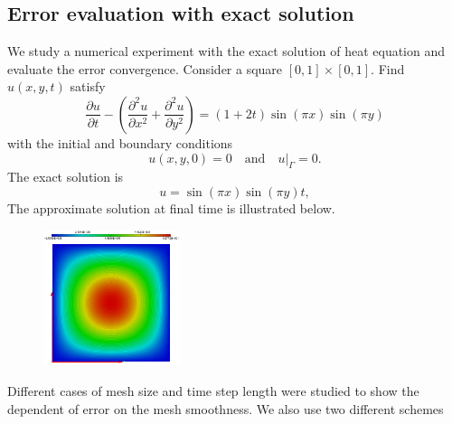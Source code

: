 \subsection{Error evaluation with exact solution}
We study a numerical experiment with the exact solution of heat equation and evaluate the error convergence. Consider a square $[0,1]\times[0,1]$. Find $u(x,y,t)$ satisfy
\begin{equation}
\dfrac{\partial u}{\partial t} - \left(\dfrac{\partial^2 u}{\partial x^2} + \dfrac{\partial^2u}{\partial y^2}\right) = (1+2t)\sin(\pi x) \sin(\pi y)
\end{equation}
with the initial and boundary conditions
$$
u(x,y,0) = 0 \quad \text{and} \quad u|_\Gamma = 0.
$$
The exact solution is
$$
u = \sin(\pi x) \sin(\pi y) t,
$$
The approximate solution at final time is illustrated below.
\begin{figure}[ht]
	\centering
	\includegraphics[width=4cm]{dirac}
\end{figure}
Different cases of mesh size and time step length were studied to show the dependent of error on the mesh smoothness. We also use two different schemes
